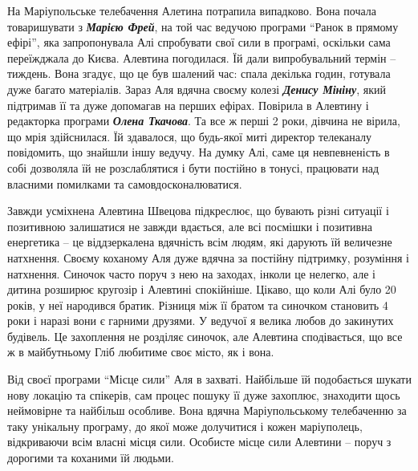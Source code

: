 
На Маріупольське телебачення Алетина потрапила випадково. Вона почала
товаришувати з \emph{\textbf{Марією Фрей}}, на той час ведучою програми \enquote{Ранок в прямому
ефірі}, яка запропонувала Алі спробувати свої сили в програмі, оскільки сама
переїжджала до Києва. Алевтина погодилася. Їй дали випробувальний термін
–тиждень. Вона згадує, що це був шалений час: спала декілька годин, готувала
дуже багато матеріалів. Зараз Аля вдячна своєму колезі \emph{\textbf{Денису Мініну}}, який
підтримав її та дуже допомагав на перших ефірах. Повірила в Алевтину і
редакторка програми \emph{\textbf{Олена Ткачова}}. Та все ж перші 2 роки, дівчина не вірила, що
мрія здійснилася. Їй здавалося, що будь-якої миті  директор телеканалу
повідомить, що знайшли іншу ведучу. На думку Алі, саме ця невпевненість в собі
дозволяла їй не розслаблятися і бути постійно в тонусі, працювати над власними
помилками та самовдосконалюватися.


Завжди усміхнена Алевтина Швецова підкреслює, що бувають різні ситуації і
позитивною залишатися не завжди вдається, але всі посмішки і позитивна
енергетика – це віддзеркалена вдячність всім людям, які дарують їй величезне
натхнення. Своєму коханому Аля дуже вдячна за постійну  підтримку, розуміння і
натхнення. Синочок часто поруч з нею на заходах, інколи це нелегко, але і
дитина розширює кругозір і Алевтині спокійніше. Цікаво, що коли Алі було 20
років, у неї народився братик. Різниця між її братом та синочком становить 4
роки і наразі вони є гарними друзями. У ведучої я велика любов до закинутих
будівель. Це захоплення не розділяє синочок, але Алевтина сподівається, що все
ж в майбутньому Гліб любитиме своє місто, як і вона.


Від своєї програми \enquote{Місце сили} Аля в захваті. Найбільше їй подобається шукати
нову локацію та спікерів, сам процес пошуку її дуже захоплює, знаходити щось
неймовірне та найбільш особливе. Вона вдячна Маріупольському телебаченню за
таку унікальну програму, до якої може долучитися і кожен маріуполець,
відкриваючи всім власні місця сили. Особисте місце сили Алевтини – поруч з
дорогими та коханими їй людьми.


